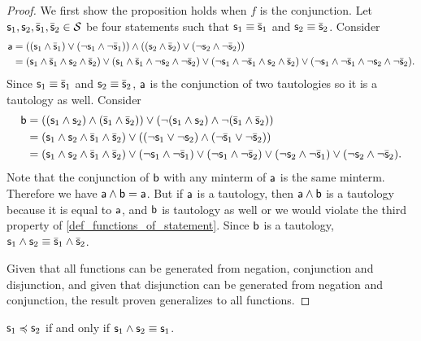 \documentclass[11pt,letterpaper,fleqn]{memoir} %
\begin{document}
\begin{mathSection}
\begin{proof}
		We first show the proposition holds when $f$ is the conjunction. Let $\stmt_1, \stmt_2, \bar{\stmt}_1, \bar{\stmt}_2 \in \mathcal{S}$ be four statements such that $\stmt_1 \equiv \bar{\stmt}_1$ and $\stmt_2 \equiv \bar{\stmt}_2$. Consider
		\begin{align*}
\stmt[a] &= ((\stmt_1 \AND \bar{\stmt}_1) \OR (\NOT \stmt_1 \AND \NOT \bar{\stmt}_1)) \AND ((\stmt_2 \AND \bar{\stmt}_2) \OR (\NOT \stmt_2 \AND \NOT \bar{\stmt}_2)) \\
&=(\stmt_1 \AND \bar{\stmt}_1 \AND \stmt_2 \AND \bar{\stmt}_2) \OR (\stmt_1 \AND \bar{\stmt}_1 \AND \NOT \stmt_2 \AND \NOT \bar{\stmt}_2) \OR (\NOT \stmt_1 \AND \NOT \bar{\stmt}_1 \AND \stmt_2 \AND \bar{\stmt}_2) \OR (\NOT \stmt_1 \AND \NOT \bar{\stmt}_1 \AND \NOT \stmt_2 \AND \NOT \bar{\stmt}_2).
		\end{align*}
		Since $\stmt_1 \equiv \bar{\stmt}_1$ and $\stmt_2 \equiv \bar{\stmt}_2$, $\stmt[a]$ is the conjunction of two tautologies so it is a tautology as well. Consider
		\begin{align*}
		\stmt[b] &= ((\stmt_1 \AND \stmt_2) \AND (\bar{\stmt}_1 \AND \bar{\stmt}_2)) \OR  (\NOT (\stmt_1 \AND \stmt_2) \AND \NOT (\bar{\stmt}_1 \AND \bar{\stmt}_2)) \\
		&= 	
		(\stmt_1 \AND \stmt_2 \AND \bar{\stmt}_1 \AND \bar{\stmt}_2) \OR ((\NOT \stmt_1 \OR \NOT \stmt_2) \AND (\NOT \bar{\stmt}_1 \OR \NOT \bar{\stmt}_2)) \\
		&= (\stmt_1 \AND \stmt_2 \AND \bar{\stmt}_1 \AND \bar{\stmt}_2) \OR (\NOT \stmt_1 \AND \NOT \bar{\stmt}_1) \OR (\NOT \stmt_1 \AND \NOT \bar{\stmt}_2) \OR (\NOT \stmt_2 \AND \NOT \bar{\stmt}_1) \OR (\NOT \stmt_2 \AND \NOT \bar{\stmt}_2).
		\end{align*}
		Note that the conjunction of $\stmt[b]$ with any minterm of $\stmt[a]$ is the same minterm. Therefore we have  $\stmt[a] \AND \stmt[b] = \stmt[a]$. But if $\stmt[a]$ is a tautology, then $\stmt[a] \AND \stmt[b]$ is a tautology because it is equal to $\stmt[a]$, and $\stmt[b]$ is tautology as well or we would violate the third property of \ref{def_functions_of_statement}. Since $\stmt[b]$ is a tautology, $\stmt_1 \AND \stmt_2 \equiv \bar{\stmt}_1 \AND \bar{\stmt}_2$.
		
		Given that all functions can be generated from negation, conjunction and disjunction, and given that disjunction can be generated from negation and conjunction, the result proven generalizes to all functions.
	\end{proof}
	
	\begin{prop}
		$\stmt_1 \narrower \stmt_2$ if and only if $\stmt_1 \AND \stmt_2 \equiv \stmt_1$.
	\end{prop}
	

\end{mathSection}
\end{document}
